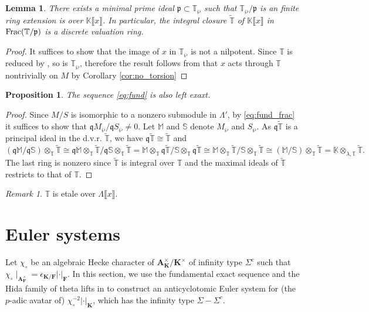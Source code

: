 \documentclass[leqno]{amsart}
\newcommand{\TT}{\mathbb{T}} %
\newcommand{\A}{\mathbf A}
\newcommand{\F}{{\mathbf{F}}} %
\newcommand{\K}{{\mathbf{K}}} %
\newcommand{\qch}{\epsilon} %
\newcommand{\fp}{\mathfrak{p}}
\newcommand{\fq}{\mathfrak{q}}
\newtheorem{lem}[thm]{Lemma}
\newtheorem{prop}[thm]{Proposition}
\theoremstyle{definition}
\theoremstyle{remark}
\newtheorem{rem}[thm]{Remark}
\begin{document}
\begin{lem}
	There exists a minimal prime ideal
	$\fp\subset \TT_{\wp}$
	such that $\TT_{\wp}/\fp$
	is an finite ring extension
	is over $\mathbb{K}\llbracket x\rrbracket$.
	In particular,
	the integral closure $\tilde{\TT}$
	of $\mathbb{K}\llbracket x\rrbracket$
	in $\textnormal{Frac}(\TT/\fp)$
	is a discrete valuation ring.
\end{lem}
\begin{proof}
	It suffices to show that 
	the image of $x$ in  $\TT_\wp$
	is not a nilpotent.
	Since $\TT$ is reduced 
	by \cite[Lem 2.14]{ger}, 
	so is $\TT_\wp$,
	therefore the result follows from that
	$x$ acts through  $\TT$ nontrivially
	on  $M$ by Corollary \ref{cor:no_torsion}
\end{proof}

\begin{prop}
	The sequence \eqref{eq:fund} is also left exaxt.
\end{prop}
\begin{proof}
	Since $M/S$ is isomorphic to a nonzero submodule 
	in  $\Lambda'$,
	by \eqref{eq:fund_frac} it suffices to show that 
	$\fq M_\wp/\fq S_\wp\neq 0$.
	Let $\mathbb{M}$ and  $\mathbb{S}$
	denote  $M_\wp$ and $S_\wp$.
	As $\fq\tilde{\TT}$ is a principal ideal
	in the d.v.r. $\tilde{\TT}$,
	we have $\fq\tilde{\TT}\cong \tilde{\TT}$ and 
\[
	(\fq \mathbb{M}/\fq \mathbb{S})\otimes_\TT
	\tilde{\TT}\cong
	\fq\mathbb{M}\otimes_\TT\tilde{\TT}/
	\fq\mathbb{S}\otimes_\TT\tilde{\TT}=
	\mathbb{M}\otimes_\TT\fq\tilde{\TT}/
	\mathbb{S}\otimes_\TT\fq\tilde{\TT} \cong 
	\mathbb{M}\otimes_\TT\tilde{\TT}/
	\mathbb{S}\otimes_\TT\tilde{\TT}\cong
	(\mathbb{M}/\mathbb{S})\otimes_\TT\tilde{\TT}=
	\mathbb{K}\otimes_{\lambda,\TT}\tilde{\TT}.
\]
The last ring is nonzero since 
$\tilde{\TT}$ is integral over $\TT$
and the maximal ideals of  $ \tilde{\TT}$ 
restricts to that of $\TT$.
\end{proof}

\begin{rem}
$\TT$ is etale over  $\Lambda\llbracket x\rrbracket$.
\end{rem}

\section{Euler systems}

Let $\chi_\circ$ be an algebraic Hecke
character of $\A_{\K}^\times/\K^\times$
of infinity type $\Sigma^c$ such that 
$\chi_\circ\mid_{\A_\F^\times}=\qch_{\K/\F}|\cdot|_\F$.
In this section,
we use the fundamental exact sequence
and the Hida family of theta lifts in \cite{lee}
to construct an anticyclotomic Euler system
for (the $p$-adic avatar of) $\chi_\circ^{-2}|\cdot|_\K$,
which has the infinity type $\Sigma-\Sigma^c$.
\end{document}
